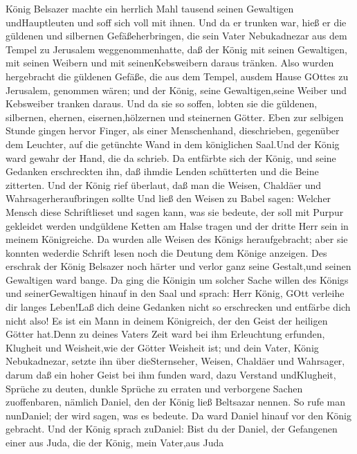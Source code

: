  König Belsazer machte ein herrlich Mahl tausend seinen
Gewaltigen undHauptleuten und soff sich voll mit ihnen.  Und
da er trunken war, hieß er die güldenen und silbernen Gefäßeherbringen,
die sein Vater Nebukadnezar aus dem Tempel zu Jerusalem
weggenommenhatte, daß der König mit seinen Gewaltigen, mit seinen
Weibern und mit seinenKebsweibern daraus tränken.  Also
wurden hergebracht die güldenen Gefäße, die aus dem Tempel, ausdem Hause
GOttes zu Jerusalem, genommen wären; und der König, seine
Gewaltigen,seine Weiber und Kebsweiber tranken daraus.  Und
da sie so soffen, lobten sie die güldenen, silbernen, ehernen,
eisernen,hölzernen und steinernen Götter.  Eben zur selbigen
Stunde gingen hervor Finger, als einer Menschenhand, dieschrieben,
gegenüber dem Leuchter, auf die getünchte Wand in dem königlichen
Saal.Und der König ward gewahr der Hand, die da schrieb.  Da
entfärbte sich der König, und seine Gedanken erschreckten ihn, daß
ihmdie Lenden schütterten und die Beine zitterten.  Und der
König rief überlaut, daß man die Weisen, Chaldäer und
Wahrsagerheraufbringen sollte Und ließ den Weisen zu Babel sagen:
Welcher Mensch diese Schriftlieset und sagen kann, was sie bedeute, der
soll mit Purpur gekleidet werden undgüldene Ketten am Halse tragen und
der dritte Herr sein in meinem Königreiche.  Da wurden alle
Weisen des Königs heraufgebracht; aber sie konnten wederdie Schrift
lesen noch die Deutung dem Könige anzeigen.  Des erschrak
der König Belsazer noch härter und verlor ganz seine Gestalt,und seinen
Gewaltigen ward bange.  Da ging die Königin um solcher
Sache willen des Königs und seinerGewaltigen hinauf in den Saal und
sprach: Herr König, GOtt verleihe dir langes Leben!Laß dich deine
Gedanken nicht so erschrecken und entfärbe dich nicht also!
 Es ist ein Mann in deinem Königreich, der den Geist der
heiligen Götter hat.Denn zu deines Vaters Zeit ward bei ihm Erleuchtung
erfunden, Klugheit und Weisheit,wie der Götter Weisheit ist; und dein
Vater, König Nebukadnezar, setzte ihn über dieSternseher, Weisen,
Chaldäer und Wahrsager,  darum daß ein hoher Geist bei ihm
funden ward, dazu Verstand undKlugheit, Sprüche zu deuten, dunkle
Sprüche zu erraten und verborgene Sachen zuoffenbaren, nämlich Daniel,
den der König ließ Beltsazar nennen. So rufe man nunDaniel; der wird
sagen, was es bedeute.  Da ward Daniel hinauf vor den König
gebracht. Und der König sprach zuDaniel: Bist du der Daniel, der
Gefangenen einer aus Juda, die der König, mein Vater,aus Juda
